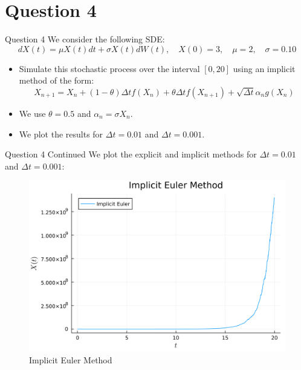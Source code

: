 \documentclass[compress,12pt]{beamer}
\begin{document}
\section{Question 4}
\begin{frame}{Question 4}
      We consider the following SDE:
      \[
      dX(t) = \mu X(t) dt + \sigma X(t) dW(t), \quad X(0)=3, \quad \mu=2 , \quad \sigma=0.10
      \]

      \begin{itemize}
            \item Simulate this stochastic process over the interval $[0,20]$ using an implicit method of the form:
            \[
            X_{n+1} = X_n + (1 - \theta) \Delta t f(X_n) + \theta \Delta t f(X_{n+1}) + \sqrt{\Delta t} \alpha_n g(X_n)
            \]
            \item We use $\theta = 0.5$ and $\alpha_n = \sigma X_n$.
            \item We plot the results for $\Delta t = 0.01$ and $\Delta t = 0.001$.
      \end{itemize}

\end{frame}

\begin{frame}{Question 4 Continued}
      We plot the explicit and implicit methods for $\Delta t = 0.01$ and $\Delta t = 0.001$:
      \begin{figure}[H]
            \centering
            \includegraphics[scale=0.04]{imgs/4implicit_euler.png}
            \caption{Implicit Euler Method}
            \label{fig:4a}
      \end{figure}
\end{frame}
\end{document}
